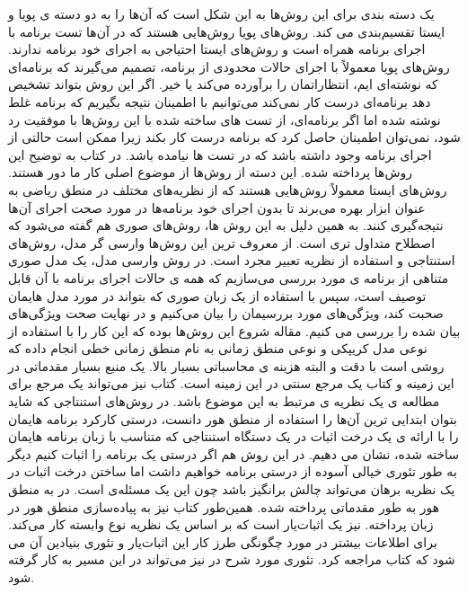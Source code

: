 یک دسته بندی برای این روش‌ها به این شکل است که آن‌ها را به دو دسته ی پویا و ایستا تقسیم‌بندی می کند. روش‌های پویا روش‌هایی هستند که در آن‌ها تست برنامه با اجرای برنامه همراه است و روش‌های ایستا احتیاجی به اجرای خود برنامه ندارند.
روش‌های پویا معمولاً با اجرای حالات محدودی از برنامه، تصمیم می‌گیرند که برنامه‌ای که نوشته‌ای ایم، انتظاراتمان را برآورده می‌کند یا خیر. اگر این روش بتواند تشخیص دهد برنامه‌ای درست کار نمی‌کند می‌توانیم با اطمینان نتیجه بگیریم که برنامه غلط نوشته شده اما اگر برنامه‌ای، از تست های ساخته شده با این روش‌ها با موفقیت رد شود، نمی‌توان اطمینان حاصل کرد که برنامه درست کار بکند زیرا ممکن است حالتی از اجرای برنامه وجود داشته باشد که در تست ها نیامده باشد. در  کتاب \cite{art}  به توضیح این روش‌ها پرداخته شده. این دسته از روش‌ها از موضوع اصلی کار ما دور هستند.
روش‌های ایستا معمولاً روش‌هایی هستند که از نظریه‌های مختلف در منطق ریاضی به عنوان ابزار بهره می‌برند تا بدون اجرای خود برنامه‌ها در مورد صحت اجرای آن‌ها نتیجه‌گیری کنند. به همین دلیل به این روش ها، روش‌های صوری هم گفته می‌شود که اصطلاح متداول تری است. از معروف ترین این روش‌ها وارسی گر مدل، روش‌های استنتاجی و استفاده از نظریه تعبیر مجرد است.
در روش وارسی مدل، یک مدل صوری متناهی از برنامه ی مورد بررسی می‌سازیم که  همه ی حالات اجرای برنامه با آن قابل توصیف است، سپس با استفاده از یک زبان صوری که بتواند در مورد مدل هایمان صحبت کند، ویژگی‌های مورد بررسیمان را بیان می‌کنیم و در نهایت صحت ویژگی‌های بیان شده را بررسی می کنیم. مقاله \cite{clarke} شروع این روش‌ها بوده که این کار را با استفاده از نوعی مدل کریپکی  \cite{kripke} و نوعی منطق زمانی به نام منطق زمانی خطی \cite{clarke} انجام داده که روشی است با دقت و البته هزینه ی محاسباتی بسیار بالا. \cite{logicincs} یک منبع بسیار مقدماتی در این زمینه و کتاب\cite{clarke2} یک مرجع سنتی در این زمینه است. کتاب\cite{dynamic} نیز می‌تواند یک مرجع برای مطالعه ی یک نظریه ی مرتبط به این موضوع باشد.
در روش‌های استنتاجی که شاید بتوان ابتدایی ترین آن‌ها را استفاده از منطق هور\cite{hoare} دانست، درستی کارکرد برنامه هایمان را با ارائه ی یک درخت اثبات در یک دستگاه استنتاجی که متناسب با زبان برنامه هایمان ساخته شده، نشان می دهیم. در این روش هم اگر درستی یک برنامه را اثبات کنیم دیگر به طور تئوری خیالی آسوده از درستی برنامه خواهیم داشت اما ساختن درخت اثبات در یک نظریه برهان می‌تواند چالش بر‌انگیز باشد چون این یک مسئله‌ی  است. در\cite{logicincs} به منطق هور به طور مقدماتی پرداخته شده. همین‌طور کتاب\cite{softwarefoundations} نیز به پیاده‌سازی منطق هور در زبان  پرداخته.    نیز یک اثبات‌یار است که بر اساس یک نظریه نوع وابسته کار می‌کند. برای اطلاعات بیشتر در مورد چگونگی طرز کار این اثبات‌یار و تئوری بنیادین آن می شود که کتاب\cite{chlipala} مراجعه کرد. تئوری مورد شرح در\cite{dynamic} نیز می‌تواند در این مسیر به کار گرفته شود.
